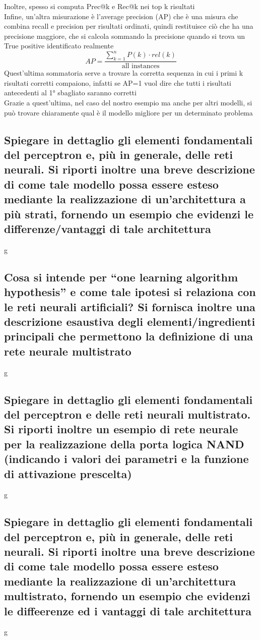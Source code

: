 \documentclass[10pt,oneside,a4paper]{article}
\begin{document}
	Inoltre, spesso si computa Prec@k e Rec@k nei top k risultati\\
	Infine, un'altra misurazione è l'average precision (AP) che è una misura che combina recall e precision per risultati ordinati, quindi restituisce ciò che ha una precisione maggiore, che si calcola sommando la precisione quando si trova un True positive identificato realmente
	\[ AP=\frac{\sum_{k=1}^{n}P(k) \cdot rel(k)}{\text{all instances}} \]
	Quest'ultima sommatoria serve a trovare la corretta sequenza in cui i primi k risultati corretti compaiono, infatti se AP=1 vuol dire che tutti i risultati antecedenti al 1° sbagliato saranno corretti\\
	Grazie a quest'ultima, nel caso del nostro esempio ma anche per altri modelli, si può trovare chiaramente qual è il modello migliore per un determinato problema
	
	
	
	
	\subsection{Spiegare in dettaglio gli elementi fondamentali del perceptron e, più in generale, delle reti
		neurali. Si riporti inoltre una breve descrizione di come tale modello possa essere esteso
		mediante la realizzazione di un’architettura a più strati, fornendo un esempio che evidenzi
		le differenze/vantaggi di tale architettura}
	g
	
	
	\subsection{Cosa si intende per “one learning algorithm hypothesis” e come tale ipotesi si relaziona
		con le reti neurali artificiali? Si fornisca inoltre una descrizione esaustiva degli elementi/ingredienti
		principali che permettono la definizione di una rete neurale multistrato}
	g
	
	
	\subsection{Spiegare in dettaglio gli elementi fondamentali del perceptron e delle reti neurali multistrato.
		Si riporti inoltre un esempio di rete neurale per la realizzazione della porta logica
		NAND (indicando i valori dei parametri e la funzione di attivazione prescelta)}
	g
	
	
	
	\subsection{Spiegare in dettaglio gli elementi fondamentali del perceptron e, più in generale, delle reti
		neurali. Si riporti inoltre una breve descrizione di come tale modello possa essere esteso
		mediante la realizzazione di un’architettura multistrato, fornendo un esempio che evidenzi
		le diffeerenze ed i vantaggi di tale architettura}
	g
	
\end{document}
